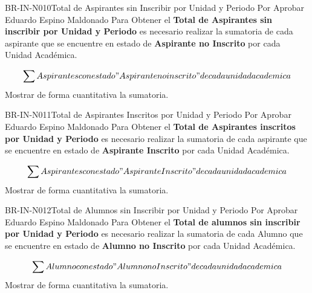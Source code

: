 \begin{BusinessRule}{BR-IN-N010}{Total de Aspirantes sin Inscribir por Unidad y Periodo}
	{\bcCondition}    %
	{\btTimer}     %
	{\blControlling}    %
	\BRItem[Estado] Por Aprobar
	 Eduardo Espino Maldonado
	\BRItem[Descripción]  Para Obtener el \textbf{Total de Aspirantes sin inscribir por Unidad y Periodo} es necesario realizar la sumatoria de cada aspirante que se encuentre en estado de \textbf{Aspirante no Inscrito} por cada Unidad Académica.
	\BRItem[Sentencia] \cdtEmpty
	
	$$ \sum  {Aspirantes con estado "Aspirante no inscrito" de cada unidad academica }$$ 
	\BRItem[Motivación] Mostrar de forma cuantitativa la sumatoria.
\end{BusinessRule}

\begin{BusinessRule}{BR-IN-N011}{Total de Aspirantes Inscritos por Unidad y Periodo}
	{\bcCondition}    %
	{\btTimer}     %
	{\blControlling}    %
	\BRItem[Estado] Por Aprobar
	 Eduardo Espino Maldonado
	\BRItem[Descripción]  Para Obtener el \textbf{Total de Aspirantes inscritos por Unidad y Periodo} es necesario realizar la sumatoria de cada aspirante que se encuentre en estado de \textbf{Aspirante Inscrito} por cada Unidad Académica.
	\BRItem[Sentencia] \cdtEmpty
	
	$$ \sum  {Aspirantes con estado "Aspirante Inscrito" de cada unidad academica }$$ 
	\BRItem[Motivación] Mostrar de forma cuantitativa la sumatoria.
\end{BusinessRule}

\begin{BusinessRule}{BR-IN-N012}{Total de Alumnos sin Inscribir por Unidad y Periodo}
	{\bcCondition}    %
	{\btTimer}     %
	{\blControlling}    %
	\BRItem[Estado] Por Aprobar
	 Eduardo Espino Maldonado
	\BRItem[Descripción]  Para Obtener el \textbf{Total de alumnos sin inscribir por Unidad y Periodo} es necesario realizar la sumatoria de cada Alumno que se encuentre en estado de \textbf{Alumno no Inscrito} por cada Unidad Académica.
	\BRItem[Sentencia] \cdtEmpty
	
	$$ \sum  {Alumno con estado "Alumno no Inscrito" de cada unidad academica }$$ 
	\BRItem[Motivación] Mostrar de forma cuantitativa la sumatoria.
\end{BusinessRule}

